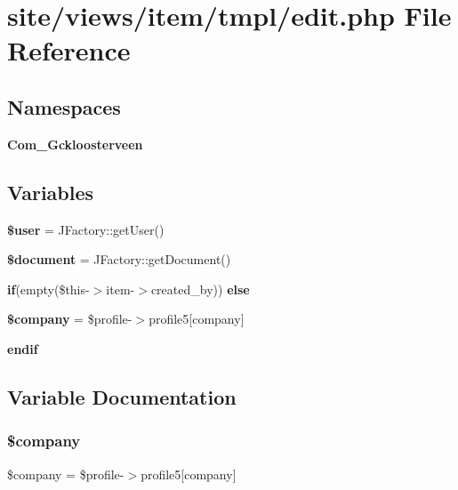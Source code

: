 \section{site/views/item/tmpl/edit.php File Reference}
\label{site_2views_2item_2tmpl_2edit_8php}
\subsection*{Namespaces}
\begin{DoxyCompactItemize}
\item 
 \textbf{ Com\+\_\+\+Gckloosterveen}
\end{DoxyCompactItemize}
\subsection*{Variables}
\begin{DoxyCompactItemize}
\item 
\textbf{ \$user} = J\+Factory\+::get\+User()
\item 
\textbf{ \$document} = J\+Factory\+::get\+Document()
\item 
\textbf{ if}(empty(\$this-\/$>$item-\/$>$created\+\_\+by)) \textbf{ else}
\item 
\textbf{ \$company} = \$profile-\/$>$profile5[\textquotesingle{}company\textquotesingle{}]
\item 
\textbf{ endif}
\end{DoxyCompactItemize}


\subsection{Variable Documentation}
\mbox{\label{site_2views_2item_2tmpl_2edit_8php_a3306bb3d7f99fc57bee9e96f928769d4}} 
\subsubsection{\$company}
{\footnotesize\ttfamily \$company = \$profile-\/$>$profile5[\textquotesingle{}company\textquotesingle{}]}

\mbox{\label{site_2views_2item_2tmpl_2edit_8php_ac5a31edb787609a3143dec9bfa8063ea}} 
